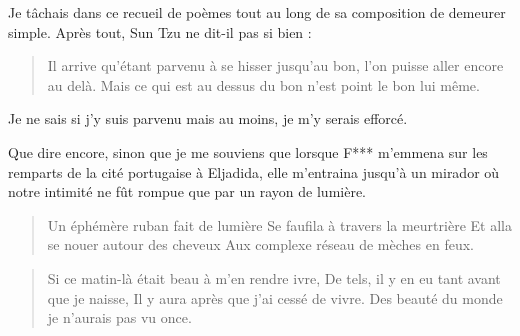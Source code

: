 \begin{prose}
  Je tâchais dans ce recueil de poèmes tout au long de sa composition de demeurer simple. Après tout, Sun Tzu ne dit-il pas si bien :

  \begin{quotation}
    Il arrive qu’étant parvenu à se hisser jusqu’au bon, l’on puisse aller encore au delà. Mais ce qui est au dessus du bon n’est point le bon lui même.
  \end{quotation}

  Je ne sais si j’y suis parvenu mais au moins, je m’y serais efforcé.
\end{prose}

\begin{prose}
Que dire encore, sinon que je me souviens que lorsque F*** m’emmena sur les remparts de la cité portugaise à Eljadida, elle m’entraina jusqu’à un mirador où notre intimité ne fût rompue que par un rayon de lumière.
\end{prose}

\begin{verse}
Un éphémère ruban fait de lumière
Se faufila à travers la meurtrière
Et alla se nouer autour des cheveux
Aux complexe réseau de mèches en feux.
\end{verse}

\begin{verse}
Si ce matin-là était beau à m’en rendre ivre,
De tels, il y en eu tant avant que je naisse,
Il y aura après que j’ai cessé de vivre.
Des beauté du monde je n’aurais pas vu once.
\end{verse}


